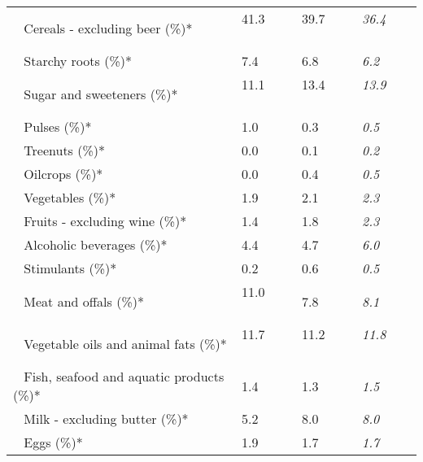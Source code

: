 \begin{tabular}{L{3.9cm} R{1cm} R{1cm} R{1cm}}
	 ~ Cereals - excluding beer (\%)* & 41.3 ~ \ \ & 39.7 ~ \ \ & \textit{36.4} ~ \ \ \\ 
	 ~ Starchy roots (\%)* & 7.4 ~ \ \ & 6.8 ~ \ \ & \textit{6.2} ~ \ \ \\ 
	 ~ Sugar and sweeteners (\%)* & 11.1 ~ \ \ & 13.4 ~ \ \ & \textit{13.9} ~ \ \ \\ 
	 ~ Pulses (\%)* & 1.0 ~ \ \ & 0.3 ~ \ \ & \textit{0.5} ~ \ \ \\ 
	 ~ Treenuts (\%)* & 0.0 ~ \ \ & 0.1 ~ \ \ & \textit{0.2} ~ \ \ \\ 
	 ~ Oilcrops (\%)* & 0.0 ~ \ \ & 0.4 ~ \ \ & \textit{0.5} ~ \ \ \\ 
	 ~ Vegetables (\%)* & 1.9 ~ \ \ & 2.1 ~ \ \ & \textit{2.3} ~ \ \ \\ 
	 ~ Fruits - excluding wine (\%)* & 1.4 ~ \ \ & 1.8 ~ \ \ & \textit{2.3} ~ \ \ \\ 
	 ~ Alcoholic beverages (\%)* & 4.4 ~ \ \ & 4.7 ~ \ \ & \textit{6.0} ~ \ \ \\ 
	 ~ Stimulants (\%)* & 0.2 ~ \ \ & 0.6 ~ \ \ & \textit{0.5} ~ \ \ \\ 
	 ~ Meat and offals (\%)* & 11.0 ~ \ \ & 7.8 ~ \ \ & \textit{8.1} ~ \ \ \\ 
	 ~ Vegetable oils and animal fats (\%)* & 11.7 ~ \ \ & 11.2 ~ \ \ & \textit{11.8} ~ \ \ \\ 
	 ~ Fish, seafood and aquatic products (\%)* & 1.4 ~ \ \ & 1.3 ~ \ \ & \textit{1.5} ~ \ \ \\ 
	 ~ Milk - excluding butter (\%)* & 5.2 ~ \ \ & 8.0 ~ \ \ & \textit{8.0} ~ \ \ \\ 
	 ~ Eggs (\%)* & 1.9 ~ \ \ & 1.7 ~ \ \ & \textit{1.7} ~ \ \ \\ 
       \toprule
      \end{tabular}
      \clearpage
{}
